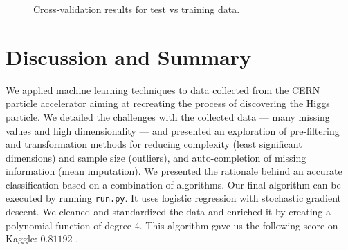 \documentclass[fleqn,9 pt]{SelfArx} %
\begin{document}
\begin{sloppypar}
\begin{figure}
\centering
\caption{\small Cross-validation results for test vs training data.}
\label{fig:cross-validation}
\end{figure}

\section{Discussion and Summary}
\label{sec-results}
We applied machine learning techniques to data collected from the CERN particle accelerator aiming at recreating the process of discovering the Higgs particle. We detailed the challenges with the collected data --- many missing values and high dimensionality --- and presented an exploration of pre-filtering and transformation methods for reducing complexity (least significant dimensions) and sample size (outliers), and auto-completion of missing information (mean imputation). We presented the rationale behind an accurate classification based on a combination of algorithms. Our final algorithm can be executed by running \texttt{run.py}. It uses logistic regression with stochastic gradient descent. We cleaned and standardized the data and enriched it by creating a polynomial function of degree 4. This algorithm gave us the following score on Kaggle: $0.81192$ .




\end{sloppypar}
\end{document}
